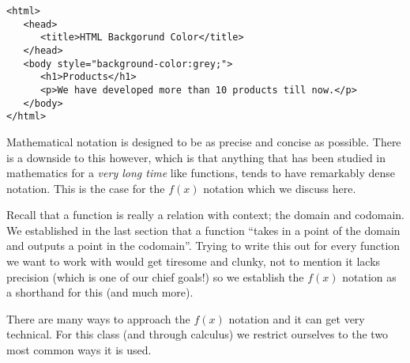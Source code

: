 \documentclass{ximera}
\begin{document}

\begin{verbatim}
<html>
   <head>
      <title>HTML Backgorund Color</title>
   </head>
   <body style="background-color:grey;">
      <h1>Products</h1>
      <p>We have developed more than 10 products till now.</p>
   </body>
</html>
\end{verbatim}


    Mathematical notation is designed to be as precise and concise as possible. There is a downside to this however, which is that anything that has been studied in mathematics for a \textit{very long time} like functions, tends to have remarkably dense notation. This is the case for the $f(x)$ notation which we discuss here.
    
    Recall that a function is really a relation with context; the domain and codomain. We established in the last section that a function ``takes in a point of the domain and outputs a point in the codomain''. Trying to write this out for every function we want to work with would get tiresome and clunky, not to mention it lacks precision (which is one of our chief goals!) so we establish the $f(x)$ notation as a shorthand for this (and much more).
    
    There are many ways to approach the $f(x)$ notation and it can get very technical. For this class (and through calculus) we restrict ourselves to the two most common ways it is used.
    
\end{document}
